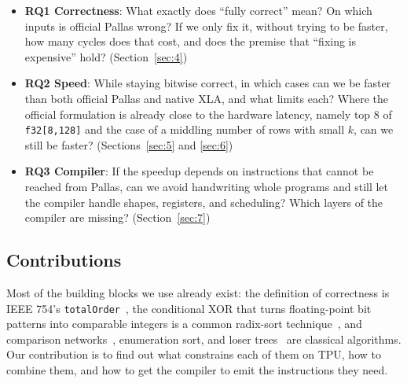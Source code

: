 \documentclass[sigconf,nonacm,balance=false]{acmart}
\newcommand{\code}[1]{\texttt{#1}}
\begin{document}
\begin{itemize}
\item \textbf{RQ1 Correctness}: What exactly does ``fully correct'' mean? On which inputs is official Pallas wrong? If we only fix it, without trying to be faster, how many cycles does that cost, and does the premise that ``fixing is expensive'' hold? (Section~\ref{sec:4})
\item \textbf{RQ2 Speed}: While staying bitwise correct, in which cases can we be faster than both official Pallas and native XLA, and what limits each? Where the official formulation is already close to the hardware latency, namely top 8 of \code{f32[8,\allowbreak{}128]} and the case of a middling number of rows with small $k$, can we still be faster? (Sections~\ref{sec:5} and \ref{sec:6})
\item \textbf{RQ3 Compiler}: If the speedup depends on instructions that cannot be reached from Pallas, can we avoid handwriting whole programs and still let the compiler handle shapes, registers, and scheduling? Which layers of the compiler are missing? (Section~\ref{sec:7})
\end{itemize}

\subsection{Contributions}
\label{sec:1.4}

Most of the building blocks we use already exist: the definition of correctness is IEEE 754's \code{total\allowbreak{}Order}~\cite{ieee754}, the conditional XOR that turns floating-point bit patterns into comparable integers is a common radix-sort technique~\cite{herf2001radix}, and comparison networks~\cite{batcher1968}, enumeration sort, and loser trees~\cite{knuth1998} are classical algorithms. Our contribution is to find out what constrains each of them on TPU, how to combine them, and how to get the compiler to emit the instructions they need.
\end{document}
